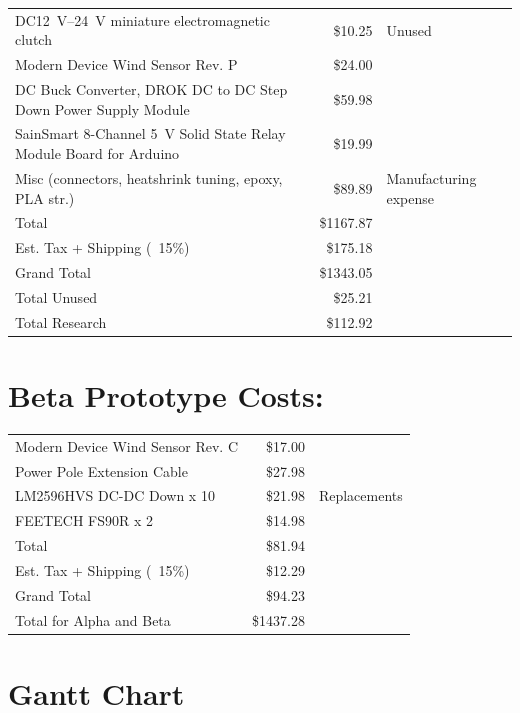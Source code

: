 \documentclass[11pt,letterpaper,conference]{IEEEtran}
\begin{document}
\begin{table}[th]
\begin{NiceTabular}{lrl}
        DC\qtyrange{12}{24}{\V} miniature electromagnetic clutch & \$10.25 & Unused \\
        Modern Device Wind Sensor Rev. P & \$24.00 & \\
        DC Buck Converter, DROK DC to DC Step Down Power Supply Module & \$59.98 & \\
        SainSmart 8-Channel \qty{5}{\V} Solid State Relay Module Board for Arduino & \$19.99 & \\
        Misc (connectors, heatshrink tuning, epoxy, PLA str.) & \$89.89 & Manufacturing expense \\
        \midrule
        Total & \$1167.87 \\
        Est. Tax + Shipping (~15\%) &  \$175.18 \\
        Grand Total & \$1343.05 \\
        Total Unused & \$25.21 \\
        Total Research & \$112.92 \\
        \bottomrule
    \end{NiceTabular}
\end{table}

\clearpage
\section*{Beta Prototype Costs:}
\begin{table}[th]
    \centering
    \begin{NiceTabular}{lrl}
        \toprule
         &  &  \\
        \midrule
        Modern Device Wind Sensor Rev. C & \$17.00 & \\
        Power Pole Extension Cable & \$27.98 & \\
        LM2596HVS DC-DC Down x 10 & \$21.98 & Replacements \\
        FEETECH FS90R x 2 & \$14.98 & \\
        \midrule
        Total & \$81.94 \\
        Est. Tax + Shipping (~15\%) &  \$12.29 \\
        Grand Total & \$94.23 \\
        Total for Alpha and Beta & \$1437.28 \\
        \bottomrule
    \end{NiceTabular}
\end{table}

\clearpage
\section{Gantt Chart}
\label{apx:gantt}
\end{document}
